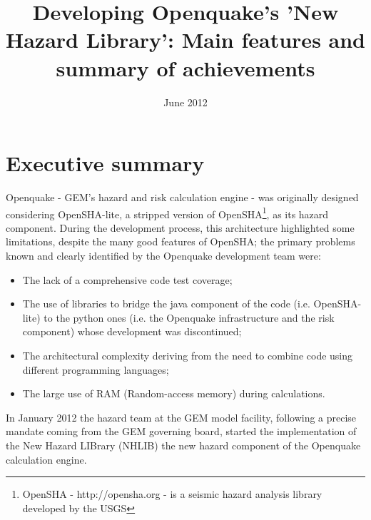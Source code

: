 \documentclass[11pt,a4paper,headings=small,dvips]{scrartcl}
\begin{document}
\setcounter{page}{1}

\begin{titlepage}
	\title{ \textcolor{blue01}{\textsf{\bfseries\Huge Developing 
        Openquake's 'New Hazard Library': Main features and summary of 
        achievements}}  }
	\date{June 2012}
	\publishers{GEM Foundation, Pavia}
\end{titlepage}

\pagestyle{scrheadings}
\maketitle

\renewcommand*\thesection{\arabic{section}}
\renewcommand*\thefigure{\thesection.\arabic{figure}}

\clearpage
\section*{Executive summary}
Openquake - GEM's hazard and risk calculation engine - was originally 
designed considering OpenSHA-lite, a stripped version of 
OpenSHA\footnote{OpenSHA - http://opensha.org - is a seismic hazard analysis 
library developed by the USGS}, as its hazard component. 
During the development process, this architecture highlighted some 
limitations, despite the many good features of OpenSHA; the primary problems 
known and clearly identified by the Openquake development team were:
\begin{itemize}
    \item The lack of a comprehensive code test coverage;
    \item The use of libraries to bridge the java component of the code (i.e. 
        OpenSHA-lite) to the python ones (i.e. the Openquake infrastructure and 
        the risk component) whose development was discontinued;
    \item The architectural complexity deriving from the need to combine code
        using different programming languages;
    \item The large use of RAM (Random-access memory) during calculations.
\end{itemize}
In January 2012 the hazard team at the GEM model facility, following a precise 
mandate coming from the GEM governing board, started the 
implementation of the New Hazard LIBrary (NHLIB) the new hazard component
of the Openquake calculation engine. 
\end{document}

